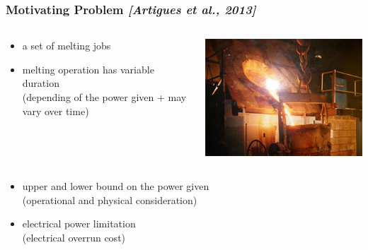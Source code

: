 \begin{frame}
  \frametitle{Motivating Problem 
 {\small \it \color{gray!50!black!50} [Artigues et al., 2013]}}
  \vfill
  \begin{columns}
    \begin{column}{0.5\linewidth}
      \begin{itemize}
      \item a set of melting jobs
        \vspace{0.4cm}
      \item melting operation has variable duration\\
        {\small (depending of the power given + may vary over time)}
         \vspace{0.4cm}
      \end{itemize}     
    \end{column}
    \hfill 
    \begin{column}{0.4\linewidth}
      \includegraphics[width=0.8\linewidth]{figures/induction.jpg}
    \end{column}
  \end{columns}
  \vfill
  \begin{itemize}
  \item upper and lower bound on the power given \\
    {\small(operational and physical consideration)}
    \vspace{0.4cm}
  \item electrical power limitation\\
    {\small(electrical overrun cost)}
  \end{itemize}
\end{frame}


